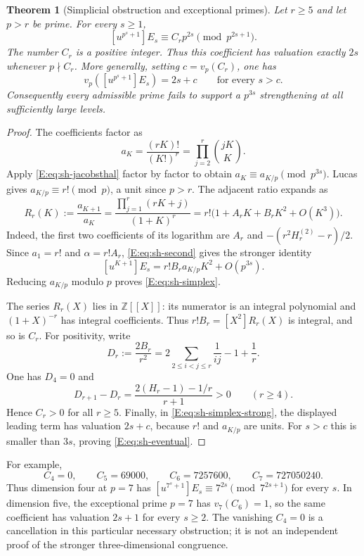 \documentclass[11pt,a4paper]{article}
\newtheorem{theorem}{Theorem}[section]
\theoremstyle{definition}\newtheorem{definition}[theorem]{Definition}
\theoremstyle{remark}\newtheorem{remark}[theorem]{Remark}
\numberwithin{equation}{section}
\begin{document}
\begin{theorem}[Simplicial obstruction and exceptional primes]
\label{E:thm:sh-simplex}
Let $r\geq5$ and let $p>r$ be prime.  For every $s\geq1$,
\begin{equation}\label{E:eq:sh-simplex}
 [u^{p^s+1}]E_s\equiv C_rp^{2s}\pmod{p^{2s+1}}.
\end{equation}
The number $C_r$ is a positive integer.  Thus this coefficient has
valuation exactly $2s$ whenever $p\nmid C_r$.
More generally, setting $c=v_p(C_r)$, one has
\begin{equation}\label{E:eq:sh-eventual}
 v_p([u^{p^s+1}]E_s)=2s+c\qquad\text{for every }s>c.
\end{equation}
Consequently every admissible prime fails to support a
$p^{3s}$ strengthening at all sufficiently large levels.
\end{theorem}
\begin{proof}
The coefficients factor as
\[
 a_K=\frac{(rK)!}{(K!)^r}=\prod_{j=2}^r\binom{jK}{K}.
\]
Apply \eqref{E:eq:sh-jacobsthal} factor by factor to obtain
$a_K\equiv a_{K/p}\pmod{p^{3s}}$.
Lucas gives $a_{K/p}\equiv r!\pmod p$, a unit since $p>r$.
The adjacent ratio expands as
\[
 R_r(K):=\frac{a_{K+1}}{a_K}
 =\frac{\prod_{j=1}^r(rK+j)}{(1+K)^r}
 =r!\bigl(1+A_rK+B_rK^2+O(K^3)\bigr).
\]
Indeed, the first two coefficients of its logarithm are
$A_r$ and $-(r^2H_r^{(2)}-r)/2$.
Since $a_1=r!$ and $\alpha=r!A_r$,
\eqref{E:eq:sh-second} gives the stronger identity
\begin{equation}\label{E:eq:sh-simplex-strong}
 [u^{K+1}]E_s=r!B_r a_{K/p}K^2+O(p^{3s}).
\end{equation}
Reducing $a_{K/p}$ modulo $p$ proves \eqref{E:eq:sh-simplex}.

The series $R_r(X)$ lies in $\mathbb Z[[X]]$: its numerator is an
integral polynomial and $(1+X)^{-r}$ has integral coefficients.
Thus $r!B_r=[X^2]R_r(X)$ is integral, and so is $C_r$.
For positivity, write
\[
 D_r:=\frac{2B_r}{r^2}
 =2\sum_{2\leq i<j\leq r}\frac1{ij}-1+\frac1r.
\]
One has $D_4=0$ and
\[
 D_{r+1}-D_r=
 \frac{2(H_r-1)-1/r}{r+1}>0\qquad(r\geq4).
\]
Hence $C_r>0$ for all $r\geq5$.
Finally, in \eqref{E:eq:sh-simplex-strong}, the displayed leading
term has valuation $2s+c$, because $r!$ and $a_{K/p}$ are units.
For $s>c$ this is smaller than $3s$, proving
\eqref{E:eq:sh-eventual}.
\end{proof}

For example,
\[
 C_4=0,\qquad C_5=69000,\qquad
 C_6=7257600,\qquad C_7=727050240.
\]
Thus dimension four at $p=7$ has
$[u^{7^s+1}]E_s\equiv7^{2s}\pmod{7^{2s+1}}$ for every $s$.
In dimension five, the exceptional prime $p=7$ has
$v_7(C_6)=1$, so the same coefficient has valuation $2s+1$
for every $s\geq2$.
The vanishing $C_4=0$ is a cancellation in this particular necessary
obstruction; it is not an independent proof of the stronger
three-dimensional congruence.
\end{document}
